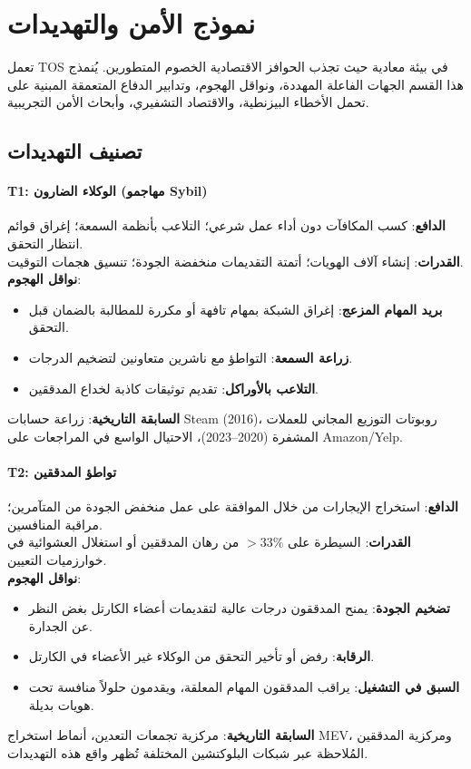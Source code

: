 \documentclass[11pt]{article}
\begin{document}
\section{نموذج الأمن والتهديدات}
\label{sec:security}

تعمل TOS في بيئة معادية حيث تجذب الحوافز الاقتصادية الخصوم المتطورين. يُنمذج هذا القسم الجهات الفاعلة المهددة، ونواقل الهجوم، وتدابير الدفاع المتعمقة المبنية على تحمل الأخطاء البيزنطية، والاقتصاد التشفيري، وأبحاث الأمن التجريبية.

\subsection{تصنيف التهديدات}

\paragraph{T1: الوكلاء الضارون (مهاجمو Sybil)}
\textbf{الدافع}: كسب المكافآت دون أداء عمل شرعي؛ التلاعب بأنظمة السمعة؛ إغراق قوائم انتظار التحقق.\\
\textbf{القدرات}: إنشاء آلاف الهويات؛ أتمتة التقديمات منخفضة الجودة؛ تنسيق هجمات التوقيت.\\
\textbf{نواقل الهجوم}:
\begin{itemize}[noitemsep]
  \item \textbf{بريد المهام المزعج}: إغراق الشبكة بمهام تافهة أو مكررة للمطالبة بالضمان قبل التحقق.
  \item \textbf{زراعة السمعة}: التواطؤ مع ناشرين متعاونين لتضخيم الدرجات.
  \item \textbf{التلاعب بالأوراكل}: تقديم توثيقات كاذبة لخداع المدققين.
\end{itemize}
\textbf{السابقة التاريخية}: زراعة حسابات Steam (2016)، روبوتات التوزيع المجاني للعملات المشفرة (2020--2023)، الاحتيال الواسع في المراجعات على Amazon/Yelp.

\paragraph{T2: تواطؤ المدققين}
\textbf{الدافع}: استخراج الإيجارات من خلال الموافقة على عمل منخفض الجودة من المتآمرين؛ مراقبة المنافسين.\\
\textbf{القدرات}: السيطرة على $>33\%$ من رهان المدققين أو استغلال العشوائية في خوارزميات التعيين.\\
\textbf{نواقل الهجوم}:
\begin{itemize}[noitemsep]
  \item \textbf{تضخيم الجودة}: يمنح المدققون درجات عالية لتقديمات أعضاء الكارتل بغض النظر عن الجدارة.
  \item \textbf{الرقابة}: رفض أو تأخير التحقق من الوكلاء غير الأعضاء في الكارتل.
  \item \textbf{السبق في التشغيل}: يراقب المدققون المهام المعلقة، ويقدمون حلولاً منافسة تحت هويات بديلة.
\end{itemize}
\textbf{السابقة التاريخية}: مركزية تجمعات التعدين، أنماط استخراج MEV، ومركزية المدققين المُلاحظة عبر شبكات البلوكتشين المختلفة تُظهر واقع هذه التهديدات.
\end{document}
